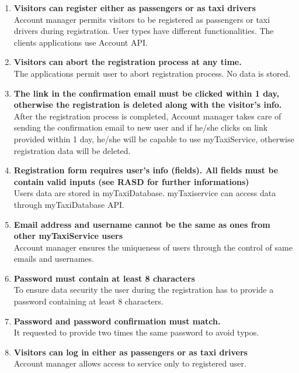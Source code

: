 \begin{enumerate}
	\item \textbf{Visitors can register either as passengers or as taxi drivers}\\
	Account manager permits visitors to be registered as passengers or taxi drivers during registration. User types have different functionalities. The clients applications use Account API.

	\item \textbf{Visitors can abort the registration process at any time.}\\
	The applications permit user to abort registration process. No data is stored.
	
	\item \textbf{The link in the confirmation email must be clicked within 1 day, otherwise the registration is deleted along with the visitor's info.}\\
	After the registration process is completed, Account manager takes care of sending the confirmation email to new user and if he/she clicks on link provided within 1 day, he/she will be capable to use myTaxiService, otherwise registration data will be deleted.
	
	\item \textbf{Registration form requires user's info (fields). All fields must be contain valid inputs (see RASD for further informations)}\\
	Users data are stored in myTaxiDatabase. myTaxiservice can access data through myTaxiDatabase API.
	
	\item \textbf{Email address and username cannot be the same as ones from other myTaxiService users}\\
	Account manager ensures the uniqueness of users through the control of same emails and usernames.
	
	\item \textbf{Password must contain at least 8 characters}\\
	To ensure data security the user during the registration has to provide a password containing at least 8 characters.  
	
	\item \textbf{Password and password confirmation must match.}\\
	It requested to provide two times the same password to avoid typos.
	
	\item \textbf{Visitors can log in either as passengers or as taxi drivers}\\
	Account manager allows access to service only to registered user.
	

\end{enumerate}
